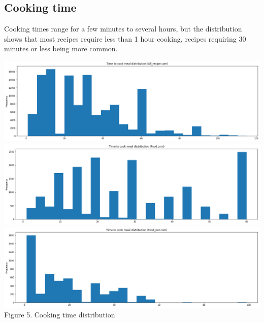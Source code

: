 \documentclass[11pt]{article}
\begin{document}
\subsection{Cooking time}

Cooking times range for a few minutes to several hours, but the distribution shows that most recipes require less than 1 hour cooking, recipes requiring 30 minutes or less being more common.

\vspace{5mm}
\begin{center}
\includegraphics[scale=0.06]{cookingtime-1}
\includegraphics[scale=0.06]{cookingtime-2}
\includegraphics[scale=0.06]{cookingtime-3}
\label{visalization-cookingtime} Figure 5. Cooking time distribution
\end{center}
\vspace{5mm}
\end{document}
